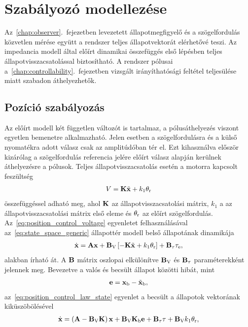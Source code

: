 \chapter{Szabályozó modellezése}\label{chap:controller}

Az~\ref{chap:observer}.\ fejezetben levezetett állapotmegfigyelő és a szögelfordulás közvetlen mérése
együtt a rendszer teljes állapotvektorát elérhetővé teszi. Az impedancia modell által előírt dinamikai összefüggés
első lépésben teljes állapotvisszacsatolással biztosítható. A rendszer pólusai a~\ref{chap:controllability}.\ fejezetben
vizsgált irányíthatósági feltétel teljesülése miatt szabadon áthelyezhetők.

\section{Pozíció szabályozás}
Az előírt modell két független változót is tartalmaz, a pólusáthelyezés viszont egyetlen bemenetre 
alkalmazható. Jelen esetben a szögelfordulásra és a külső nyomatékra adott válasz csak az amplitúdóban
tér el. Ezt kihasználva először kizárólag a szögelfordulás referencia jelére előírt válasz alapján 
kerülnek áthelyezésre a pólusok. Teljes állapotvisszacsatolás esetén a motorra kapcsolt feszültség
\begin{align}\label{eq:position_control_voltage}
    V = \mathbf{K} \tilde{\mathbf{x}} + k_1 \theta_{\mathrm{r}}
\end{align}
összefüggéssel adható meg, 
ahol $\mathbf{K}$ az állapotvisszacsatolási mátrix, 
$k_1$ a az állapotvisszacsatolási mátrix első eleme és 
$\theta_{\mathrm{r}}$ az előírt szögelfordulás. Az~\eqref{eq:position_control_voltage} egyenletet felhasználásával
az~\eqref{eq:state_space_generic} állapottér modell belső állapotának dinamikája
\begin{align}\label{eq:position_control_law_state}
    \dot{\mathbf{x}} = \mathbf{A} \mathbf{x} + \mathbf{B}_{\mathrm{V}}\left[-\mathbf{K} \tilde{\mathbf{x}} + k_1 \theta_{\mathrm{r}}\right] + \mathbf{B}_{\mathrm{\tau}} \tau_{\mathrm{e}},
\end{align}
alakban írható át. A $\mathbf{B}$ mátrix oszlopai elkülönítve $\mathbf{B}_{\mathrm{V}}$ és $\mathbf{B}_{\mathrm{\tau}}$ paraméterekként jelennek meg.
Bevezetve a valós és becsült állapot közötti hibát, mint
\begin{align}
    \mathbf{e} = \mathbf{x}_{\mathrm{b}} - \tilde{\mathbf{x}}_{\mathrm{b}},
\end{align}
az~\eqref{eq:position_control_law_state} egyenlet a becsült a állapotok vektorának kiküszöbölésével
\begin{align}
    \dot{\mathbf{x}} = \left(\mathbf{A} - \mathbf{B}_{\mathrm{V}} \mathbf{K}\right) \mathbf{x} + 
    \mathbf{B}_{\mathrm{V}} \mathbf{K}_{\mathrm{b}} \mathbf{e} + 
    \mathbf{B}_{\mathrm{\tau}} \tau + 
    \mathbf{B}_{\mathrm{V}} k_1 \theta_{\mathrm{r}},
\end{align}
